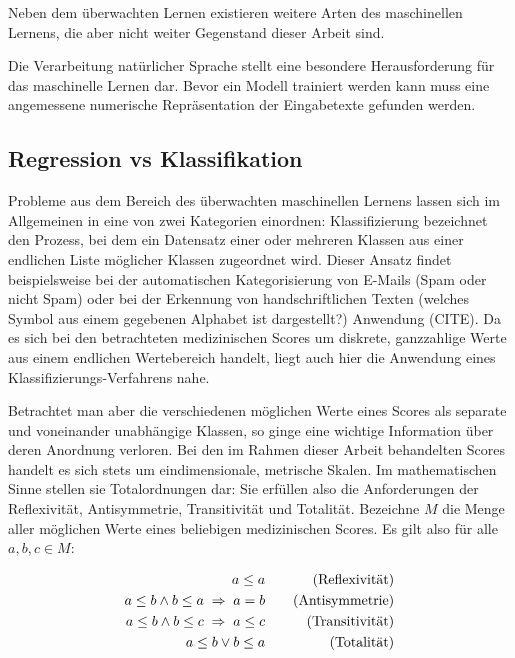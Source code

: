 Neben dem überwachten Lernen existieren weitere Arten des maschinellen Lernens, die aber nicht weiter Gegenstand dieser Arbeit sind.

Die Verarbeitung natürlicher Sprache stellt eine besondere Herausforderung für das maschinelle Lernen dar.
Bevor ein Modell trainiert werden kann muss eine angemessene numerische Repräsentation der Eingabetexte gefunden werden. 

\subsection{Regression vs Klassifikation}\label{section:regrvsclf}
Probleme aus dem Bereich des überwachten maschinellen Lernens lassen sich im Allgemeinen in eine von zwei Kategorien einordnen:
Klassifizierung bezeichnet den Prozess, bei dem ein Datensatz einer oder mehreren Klassen aus einer endlichen Liste möglicher Klassen zugeordnet wird. Dieser Ansatz findet beispielsweise bei der automatischen Kategorisierung von E-Mails (Spam oder nicht Spam) oder bei der Erkennung von handschriftlichen Texten (welches Symbol aus einem gegebenen Alphabet ist dargestellt?) Anwendung (CITE). 
Da es sich bei den betrachteten medizinischen Scores um diskrete, ganzzahlige Werte aus einem endlichen Wertebereich handelt, liegt auch hier die Anwendung eines Klassifizierungs-Verfahrens nahe.

Betrachtet man aber die verschiedenen möglichen Werte eines Scores als separate und voneinander unabhängige Klassen, so ginge eine wichtige Information über deren Anordnung verloren. Bei den im Rahmen dieser Arbeit behandelten Scores handelt es sich stets um eindimensionale, metrische Skalen. Im mathematischen Sinne stellen sie Totalordnungen dar: Sie erfüllen also die Anforderungen der Reflexivität, Antisymmetrie, Transitivität und Totalität. Bezeichne $M$ die Menge aller möglichen Werte eines beliebigen medizinischen Scores. Es gilt also für alle $a,b,c \in M$:

\begin{equation*}
    \centering
    \begin{aligned}[c]
        a \leq a\\
        a \leq b \land b \leq a \; \Rightarrow \; a=b\\
        a \leq b \land b \leq c \; \Rightarrow \; a \leq c\\
        a \leq b \lor b \leq a
    \end{aligned}
    \qquad
    \begin{aligned}[c]
        \text{(Reflexivität)}\\
        \text{(Antisymmetrie)}\\
        \text{(Transitivität)}\\
        \text{(Totalität)}
    \end{aligned}
\end{equation*}

